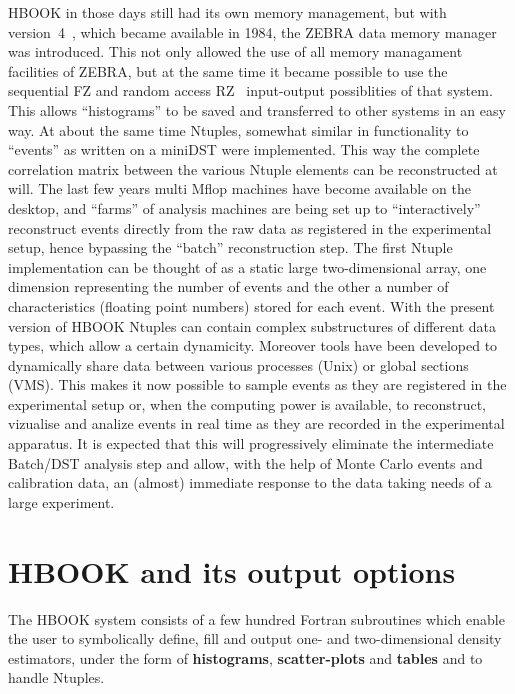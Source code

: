 HBOOK in those days still had its own memory management, but with 
version~4~\cite{bib-HBOOK4}, which became available in 1984, the
ZEBRA data memory manager was introduced.
This not only allowed the use of all memory managament facilities of ZEBRA,
but at the same time it became possible to use the sequential 
FZ and random access RZ~\cite{bib-ZEBRA} input-output
possiblities of that system.
This allows ``histograms'' to be saved and transferred to other systems
in an easy way.
At about the same time Ntuples, somewhat similar in functionality to 
``events'' as written on a miniDST were implemented.
This way the complete correlation matrix between the various
Ntuple elements can be reconstructed at will. 
The last few years multi Mflop machines have become available
on the desktop, and ``farms'' of analysis machines are being set up
to ``interactively'' reconstruct events directly from the
raw data as registered in the experimental setup, hence bypassing the
``batch'' reconstruction step.
The first Ntuple implementation can be thought of as a static large
two-dimensional array, one dimension representing the number of events
and the other a number of characteristics (floating point numbers)
stored for each event. 
With the present version of HBOOK Ntuples can contain complex
substructures of different data types, which allow a certain dynamicity.
Moreover tools have been developed to dynamically share
data between various processes (Unix) or global sections (VMS).
This makes it now possible to sample events as they are registered 
in the experimental setup or, when the computing power is
available, to reconstruct, vizualise and analize events in real time
as they are recorded in the experimental apparatus.
It is expected that this will progressively eliminate the intermediate
Batch/DST analysis step and allow, with the help of Monte Carlo events 
and calibration data, an (almost) immediate response to the
data taking needs of a large experiment.

\section{HBOOK and its output options}
\label{HOUTOPTS}

The HBOOK system consists of a few hundred Fortran
subroutines which enable the user to symbolically define, fill and output
one- and two-dimensional density estimators, under the form
of {\bf histograms}, {\bf scatter-plots} and {\bf tables} and
to handle Ntuples.


